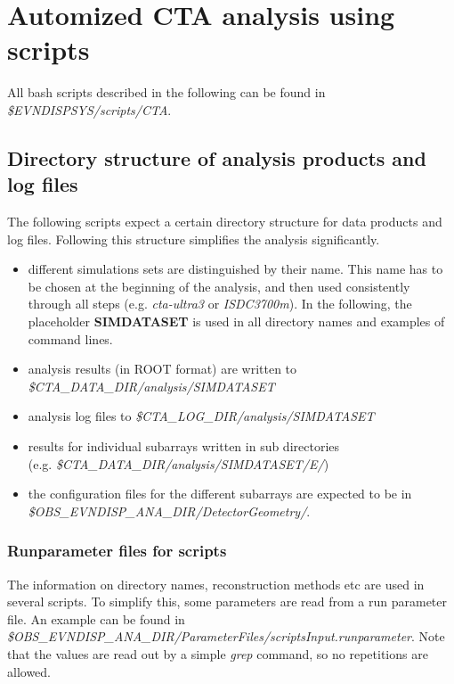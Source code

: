 \documentclass[titlepage,a4paper,twoside,11pt]{report}
\begin{document}
\section{Automized CTA analysis using scripts}
\label{SECTION.CTASCRIPTANALYSIS}

All bash scripts described in the following can be found in {\it \$EVNDISPSYS/scripts/CTA}.

\subsection{Directory structure of analysis products and log files}

The following scripts expect a certain directory structure for data products and log files.
Following this structure simplifies the analysis significantly.

\begin{itemize}
\item different simulations sets are distinguished by their name. This name has to be chosen at the beginning of the analysis, and then used consistently through all steps (e.g. {\it cta-ultra3} or {\it ISDC3700m}). In the following, the placeholder {\bf SIMDATASET} is used in all directory names and examples of command lines.
\item  analysis results (in ROOT format)  are written to \\
{\it \$CTA\_DATA\_DIR/analysis/SIMDATASET}
\item analysis log files to {\it \$CTA\_LOG\_DIR/analysis/SIMDATASET}
\item results for individual subarrays written in sub directories \\
 (e.g. {\it \$CTA\_DATA\_DIR/analysis/SIMDATASET/E/})
 \item the configuration files for the different subarrays are expected to be in \\
 {\it \$OBS\_EVNDISP\_ANA\_DIR/DetectorGeometry/}.
\end{itemize}

\subsubsection{Runparameter files for scripts}
\label{SEC:scriptsRunParameter}

The information on directory names, reconstruction methods etc are used in several scripts. 
To simplify this, some parameters are read from a run parameter file. 
An example can be found in {\it\$OBS\_EVNDISP\_ANA\_DIR/ParameterFiles/scriptsInput.runparameter}.
Note that the values are read out by a simple {\it grep} command, so no repetitions are allowed. 
\end{document}
